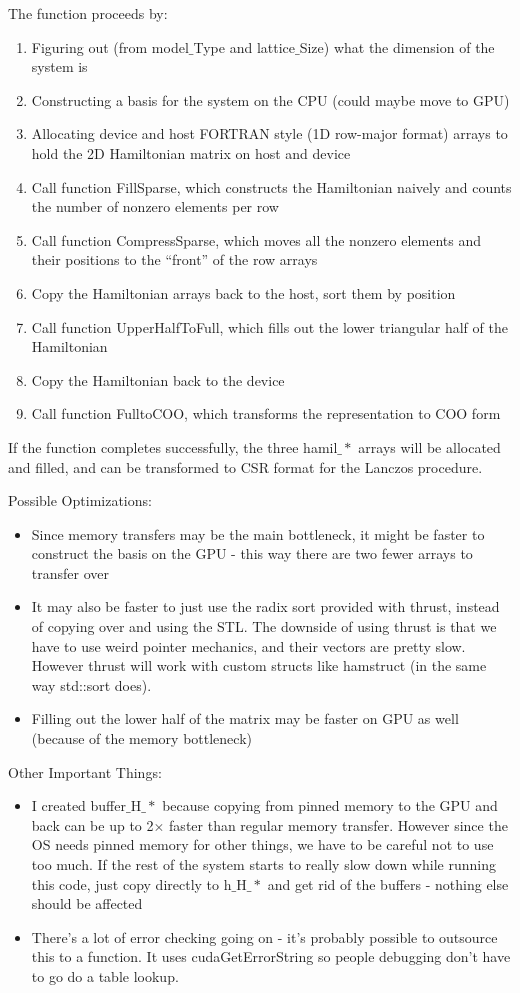 \documentclass{article}
\begin{document}
The function proceeds by:
\begin{enumerate}
\item{Figuring out (from model$\_$Type and lattice$\_$Size) what the dimension of the system is}
\item{Constructing a basis for the system on the CPU (could maybe move to GPU)}
\item{Allocating device and host FORTRAN style (1D row-major format) arrays to hold the 2D Hamiltonian matrix on host and device}
\item{Call function FillSparse, which constructs the Hamiltonian naively and counts the number of nonzero elements per row}
\item{Call function CompressSparse, which moves all the nonzero elements and their positions to the ``front'' of the row arrays}
\item{Copy the Hamiltonian arrays back to the host, sort them by position}
\item{Call function UpperHalfToFull, which fills out the lower triangular half of the Hamiltonian}
\item{Copy the Hamiltonian back to the device}
\item{Call function FulltoCOO, which transforms the representation to COO form}
\end{enumerate}

If the function completes successfully, the three hamil$\_*$ arrays will be allocated and filled, and can be transformed to CSR format for the Lanczos procedure.
 
Possible Optimizations:
\begin{itemize}
\item{Since memory transfers may be the main bottleneck, it might be faster to construct the basis on the GPU - this way there are two fewer arrays to transfer over}
\item{It may also be faster to just use the radix sort provided with thrust, instead of copying over and using the STL. The downside of using thrust is that we have to use weird pointer mechanics, and their vectors are pretty slow. However thrust will work with custom structs like hamstruct (in the same way std::sort does).}
\item{Filling out the lower half of the matrix may be faster on GPU as well (because of the memory bottleneck)}
\end{itemize}

Other Important Things:
\begin{itemize}
\item{I created buffer$\_$H$\_*$ because copying from pinned memory to the GPU and back can be up to 2$\times$ faster than regular memory transfer. However since the OS needs pinned memory for other things, we have to be careful not to use too much. If the rest of the system starts to really slow down while running this code, just copy directly to h$\_$H$\_*$ and get rid of the buffers - nothing else should be affected}
\item{ There's a lot of error checking going on - it's probably possible to outsource this to a function. It uses cudaGetErrorString so people debugging don't have to go do a table lookup.}
\end{itemize} 
\end{document}

